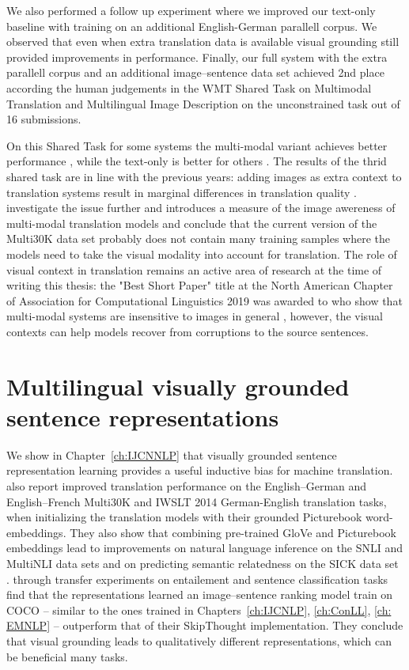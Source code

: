 We also performed a follow up experiment where we improved our text-only baseline with 
training on an additional English-German parallell corpus. We observed that even when
extra translation data is available visual grounding still provided improvements in performance.
Finally, our full system with the extra parallell corpus and an additional image--sentence data set achieved
2nd place according the human judgements in the WMT Shared Task on Multimodal Translation 
and Multilingual Image Description \citep{elliott2017findings} 
on the unconstrained task out of 16 submissions. 

On this Shared Task for some
systems the multi-modal variant achieves better performance
\citep{caglayan2017lium}, while the text-only is better for others \citep{ma2017osu}. 
The results of the thrid shared task are in line with the previous years:
adding images as extra context to translation systems result in marginal 
differences in translation quality \citep{barrault2018findings}.
\cite{elliott2018adversarial} investigate the issue further and introduces
a measure of the image awereness of multi-modal translation models and conclude that the current 
version of the Multi30K data set probably does not contain many training samples where the models 
need to take the visual modality into account for translation. The role of visual context in translation
remains an active area of research at the time of writing this thesis: the "Best Short Paper" title
at the North American Chapter of Association for Computational Linguistics 2019 was awarded to
\citep{caglayan2019probing} who show that multi-modal systems are insensitive to images in general
, however, the visual contexts can help models recover from corruptions to the source sentences.


\section{Multilingual visually grounded sentence representations}

We show in Chapter~\ref{ch:IJCNNLP} that visually grounded sentence representation learning
provides a useful inductive bias for machine translation. \cite{kiros2018illustrative} also report 
improved translation performance on the English--German and English--French Multi30K 
and IWSLT 2014 German-English  \citep{cettolo2014report} translation tasks, when initializing
the translation models with their grounded Picturebook word-embeddings. They also show that
combining pre-trained GloVe \citep{pennington2014glove} and Picturebook embeddings lead 
to improvements on natural language inference on the SNLI 
\citep{bowman2015large} and MultiNLI \cite{williams2017broad} data sets and on predicting
semantic relatedness on the SICK data set \citep{marelli2014semeval}. 
\citep{kiela2017learning} through transfer experiments on
entailement and sentence classification tasks find that the representations learned an 
image--sentence ranking model train on COCO -- similar to the ones trained in Chapters~\ref{ch:IJCNLP}, 
\ref{ch:ConLL}, \ref{ch: EMNLP}  -- outperform that of their SkipThought \citep{kiros2015skip} 
implementation. They conclude that visual grounding leads to qualitatively different representations, which
can be beneficial many tasks.

